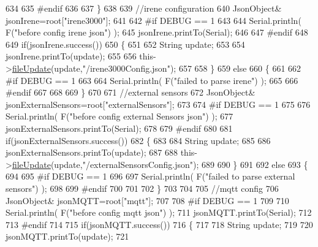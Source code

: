 \begin{DoxyCode}
634     
635 \textcolor{preprocessor}{    #endif}
636 
637     \}
638     
639     \textcolor{comment}{//irene configuration   }
640         JsonObject& jsonIrene=root[\textcolor{stringliteral}{"irene3000"}];
641     
642 \textcolor{preprocessor}{#if DEBUG == 1 }
643 
644     Serial.println( F(\textcolor{stringliteral}{"before config irene json"}) );    
645     jsonIrene.printTo(Serial);
646 
647 \textcolor{preprocessor}{#endif }
648 
649     \textcolor{keywordflow}{if}(jsonIrene.success())
650     \{
651 
652         String update;
653     
654         jsonIrene.printTo(update);
655 
656         this->\hyperlink{class_cool_file_system_a13f2958f5b87757c31fc53797a30d23a}{fileUpdate}(update,\textcolor{stringliteral}{"/irene3000Config.json"});     
657     
658     \}
659     \textcolor{keywordflow}{else}
660     \{
661     
662 \textcolor{preprocessor}{    #if DEBUG == 1 }
663 
664         Serial.println( F(\textcolor{stringliteral}{"failed to parse irene"}) );   
665     
666 \textcolor{preprocessor}{    #endif }
667 
668 
669     \}
670     
671     \textcolor{comment}{//external sensors}
672         JsonObject& jsonExternalSensors=root[\textcolor{stringliteral}{"externalSensors"}];
673 
674 \textcolor{preprocessor}{#if DEBUG == 1 }
675 
676     Serial.println( F(\textcolor{stringliteral}{"before config external Sensors json"}) );
677     jsonExternalSensors.printTo(Serial);
678 
679 \textcolor{preprocessor}{#endif}
680 
681     \textcolor{keywordflow}{if}(jsonExternalSensors.success())
682     \{
683 
684         String update;
685     
686         jsonExternalSensors.printTo(update);
687 
688         this->\hyperlink{class_cool_file_system_a13f2958f5b87757c31fc53797a30d23a}{fileUpdate}(update,\textcolor{stringliteral}{"/externalSensorsConfig.json"});       
689 
690     \}
691 
692     \textcolor{keywordflow}{else}
693     \{   
694 
695 \textcolor{preprocessor}{    #if DEBUG == 1}
696         
697         Serial.println( F(\textcolor{stringliteral}{"failed to parse external sensors"}) );
698 
699 \textcolor{preprocessor}{    #endif}
700 
701 
702     \}
703 
704     
705     \textcolor{comment}{//mqtt config}
706         JsonObject& jsonMQTT=root[\textcolor{stringliteral}{"mqtt"}];
707     
708 \textcolor{preprocessor}{#if DEBUG == 1 }
709 
710     Serial.println( F(\textcolor{stringliteral}{"before config mqtt json"}) );
711     jsonMQTT.printTo(Serial);
712 
713 \textcolor{preprocessor}{#endif}
714 
715     \textcolor{keywordflow}{if}(jsonMQTT.success())
716     \{
717 
718         String update;
719     
720         jsonMQTT.printTo(update);
721 

\end{DoxyCode}
